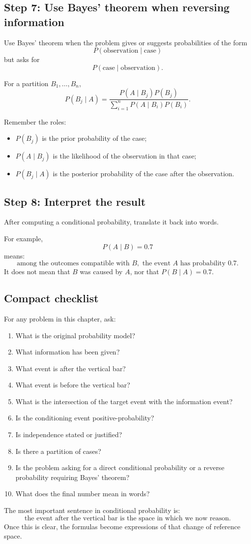 \subsection*{Step 7: Use Bayes' theorem when reversing information}

Use Bayes' theorem when the problem gives or suggests probabilities of the form
\[
P(\text{observation}\mid\text{case})
\]
but asks for
\[
P(\text{case}\mid\text{observation}).
\]

For a partition \(B_1,
\ldots,B_n\),
\[
P(B_j\mid A)=
\frac{P(A\mid B_j)P(B_j)}
{\sum_{i=1}^n P(A\mid B_i)P(B_i)}.
\]

Remember the roles:
\begin{itemize}
    \item \(P(B_j)\) is the prior probability of the case;
    \item \(P(A\mid B_j)\) is the likelihood of the observation in that case;
    \item \(P(B_j\mid A)\) is the posterior probability of the case after the
    observation.
\end{itemize}

\subsection*{Step 8: Interpret the result}

After computing a conditional probability, translate it back into words.

For example,
\[
P(A\mid B)=0.7
\]
means:
\[
\text{among the outcomes compatible with }B,\text{ the event }A\text{ has probability }0.7.
\]
It does not mean that \(B\) was caused by \(A\), nor that \(P(B\mid A)=0.7\).

\subsection*{Compact checklist}

For any problem in this chapter, ask:

\begin{enumerate}
    \item What is the original probability model?
    \item What information has been given?
    \item What event is after the vertical bar?
    \item What event is before the vertical bar?
    \item What is the intersection of the target event with the information
    event?
    \item Is the conditioning event positive-probability?
    \item Is independence stated or justified?
    \item Is there a partition of cases?
    \item Is the problem asking for a direct conditional probability or a reverse
    probability requiring Bayes' theorem?
    \item What does the final number mean in words?
\end{enumerate}

\begin{theorembox}
The most important sentence in conditional probability is:
\[
\text{the event after the vertical bar is the space in which we now reason.}
\]
Once this is clear, the formulas become expressions of that change of reference
space.
\end{theorembox}
